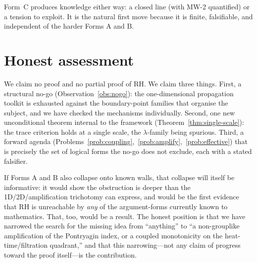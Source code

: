 \documentclass[11pt]{amsart}
\theoremstyle{definition}
\theoremstyle{remark}
\begin{document}
Form~C produces knowledge either way: a closed line (with MW-2 quantified)
or a tension to exploit. It is the natural first move because it is finite,
falsifiable, and independent of the harder Forms A and B.

\section{Honest assessment}\label{sec:assessment}

We claim no proof and no partial proof of RH. We claim three things.
First, a structural no-go (Observation~\ref{obs:nogo}): the
one-dimensional propagation toolkit is exhausted against the
boundary-point families that organise the subject, and we have checked the
mechanisms individually. Second, one new unconditional theorem internal to
the framework (Theorem~\ref{thm:single-scale}): the trace criterion holds at
a single scale, the $\lambda$-family being spurious. Third, a forward
agenda (Problems~\ref{prob:coupling},~\ref{prob:amplify},~\ref{prob:effective})
that is precisely the set of logical forms the no-go does not exclude, each
with a stated falsifier.

If Forms A and B also collapse onto known walls, that collapse will itself
be informative: it would show the obstruction is deeper than the
1D/2D/amplification trichotomy can express, and would be the first
evidence that RH is unreachable by \emph{any} of the argument-forms
currently known to mathematics. That, too, would be a result. The honest
position is that we have narrowed the search for the missing idea from
``anything'' to ``a non-grouplike amplification of the Pontryagin index,
or a coupled monotonicity on the heat-time/filtration quadrant,'' and that
this narrowing---not any claim of progress toward the proof itself---is the
contribution.
\end{document}
